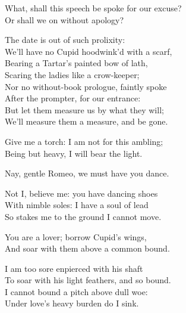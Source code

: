  
\begin{speech}
What, shall this speech be spoke for our excuse? \\

Or shall we on without apology? \\
\end{speech}
\begin{speech}
The date is out of such prolixity: \\
We'll have no Cupid hoodwink'd with a scarf, \\
Bearing a Tartar's painted bow of lath, \\
Scaring the ladies like a crow-keeper; \\
Nor no without-book prologue, faintly spoke \\
After the prompter, for our entrance: \\
But let them measure us by what they will; \\
We'll measure them a measure, and be gone. \\
\end{speech}
\begin{speech}
Give me a torch: I am not for this ambling; \\
Being but heavy, I will bear the light. \\
\end{speech}
\begin{speech}
Nay, gentle Romeo, we must have you dance. \\
\end{speech}
\begin{speech}
Not I, believe me: you have dancing shoes \\
With nimble soles: I have a soul of lead \\
So stakes me to the ground I cannot move. \\
\end{speech}
\begin{speech}
You are a lover; borrow Cupid's wings, \\
And soar with them above a common bound. \\
\end{speech}
\begin{speech}
I am too sore enpierced with his shaft \\
To soar with his light feathers, and so bound. \\
I cannot bound a pitch above dull woe: \\
Under love's heavy burden do I sink. \\
\end{speech}
